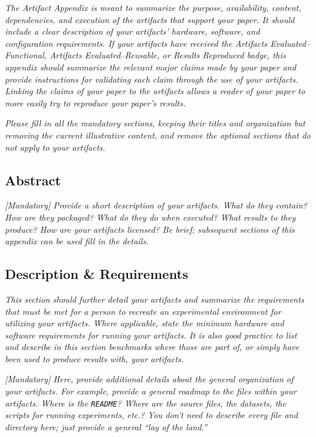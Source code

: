 \documentclass[sigconf]{acmart}
\begin{document}
\emph{The Artifact Appendix is meant to summarize the purpose,
availability, content, dependencies, and execution of the artifacts
that support your paper.  It should include a clear description of
your artifacts' hardware, software, and configuration requirements.
If your artifacts have received the \emph{Artifacts
Evaluated--Functional}, \emph{Artifacts Evaluated--Reusable}, or
\emph{Results Reproduced} badge, this appendix should summarize the
relevant major claims made by your paper and provide instructions for
validating each claim through the use of your artifacts.  Linking the
claims of your paper to the artifacts allows a reader of your paper
to more easily try to reproduce your paper's results.}

\emph{Please fill in all the mandatory sections, keeping their titles
and organization but removing the current illustrative content, and
remove the optional sections that do not apply to your artifacts.}


\subsection{Abstract}

\emph{[Mandatory]}
%
\emph{Provide a short description of your artifacts.  What do they
contain?  How are they packaged?  What do they do when executed?  What
results to they produce?  How are your artifacts licensed?  Be brief;
subsequent sections of this appendix can be used fill in the details.}


\subsection{Description \& Requirements}

\emph{This section should further detail your artifacts and summarize
the requirements that must be met for a person to recreate an
experimental environment for utilizing your artifacts.  Where
applicable, state the minimum hardware and software requirements for
running your artifacts.  It is also good practice to list and describe
in this section benchmarks where those are part of, or simply have
been used to produce results with, your artifacts.}

\emph{[Mandatory]}
%
\emph{Here, provide additional details about the general organization
of your artifacts.  For example, provide a general roadmap to the
files within your artifacts.  Where is the \texttt{README}?  Where are
the source files, the datasets, the scripts for running experiments,
etc.?  You don't need to describe every file and directory here; just
provide a general ``lay of the land.''}
\end{document}
